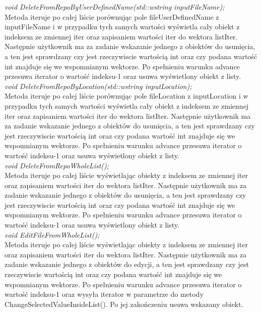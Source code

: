 \documentclass[10pt, a4paper]{article}
\begin{document}
\textit{void DeleteFromRepoByUserDefinedName(std::wstring inputFileName);}\\
Metoda iteruje po całej liście porównując pole fileUserDefinedName z inputFileName i w przypadku tych samych wartości wyświetla cały obiekt z indeksem ze zmiennej iter oraz zapisaniem wartości iter do wektora listIter. Następnie użytkownik ma za zadanie wskazanie jednego z obiektów do usunięcia, a ten jest sprawdzany czy jest rzeczywiscie wartością int oraz czy podana wartość int znajduje się we wspomnianym wektorze. Po spełnieniu warunku advance przesuwa iterator o wartość indeksu-1 oraz usuwa wyświetlony obiekt z listy.\\

\textit{void DeleteFromRepoByLocation(std::wstring inputLocation);}\\
Metoda iteruje po całej liście porównując pole fileLocation z inputLocation i w przypadku tych samych wartości wyświetla cały obiekt z indeksem ze zmiennej iter oraz zapisaniem wartości iter do wektora listIter. Następnie użytkownik ma za zadanie wskazanie jednego z obiektów do usunięcia, a ten jest sprawdzany czy jest rzeczywiscie wartością int oraz czy podana wartość int znajduje się we wspomnianym wektorze. Po spełnieniu warunku advance przesuwa iterator o wartość indeksu-1 oraz usuwa wyświetlony obiekt z listy.\\

\textit{void DeleteFromRepoWholeList();}\\
Metoda iteruje po całej liście wyświetlając obiekty z indeksem ze zmiennej iter oraz zapisaniem wartości iter do wektora listIter. Następnie użytkownik ma za zadanie wskazanie jednego z obiektów do usunięcia, a ten jest sprawdzany czy jest rzeczywiscie wartością int oraz czy podana wartość int znajduje się we wspomnianym wektorze. Po spełnieniu warunku advance przesuwa iterator o wartość indeksu-1 oraz usuwa wyświetlony obiekt z listy.\\

\textit{void EditFileFromWholeList();}\\
Metoda iteruje po całej liście wyświetlając obiekty z indeksem ze zmiennej iter oraz zapisaniem wartości iter do wektora listIter. Następnie użytkownik ma za zadanie wskazanie jednego z obiektów do edycji, a ten jest sprawdzany czy jest rzeczywiscie wartością int oraz czy podana wartość int znajduje się we wspomnianym wektorze. Po spełnieniu warunku advance przesuwa iterator o wartość indeksu-1 oraz wysyła iterator w parametrze do metody ChangeSelectedValueInsideList(). Po jej zakończeniu usuwa wskazany obiekt.\\
\end{document}

